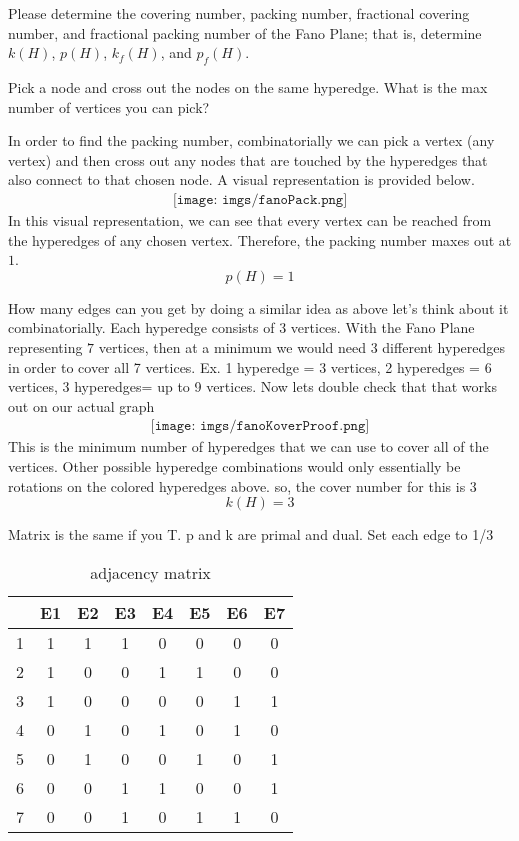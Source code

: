 \documentclass[10pt, AMS Euler]{article}
\begin{document}
Please determine the covering number, packing number, fractional covering number, and fractional packing number of the Fano Plane; that is, determine $k(H)$, $p(H)$, $k_f(H)$, and $p_f(H)$.



Pick a node and cross out the nodes on the same hyperedge. What is the max number of vertices you can pick?

In order to find the packing number, combinatorially we can pick a vertex (any vertex) and then cross out any nodes that are touched by the hyperedges that also connect to that chosen node.  A visual representation is provided below.
\begin{align*}
    \texttt{[image: imgs/fanoPack.png]}
\end{align*}
In this visual representation, we can see that every vertex can be reached from the hyperedges of any chosen vertex. Therefore, the packing number maxes out at $1$.
$$ p(H) = 1 $$

How many edges can you get by doing a similar idea as above 
let's think about it combinatorially. Each hyperedge consists of 3 vertices. With the Fano Plane representing $7$ vertices, then at a minimum we would need 3 different hyperedges in order to cover all 7 vertices. Ex. 1 hyperedge = 3 vertices, 2 hyperedges = 6 vertices, 3 hyperedges= up to 9 vertices. Now lets double check that that works out on our actual graph
\begin{align*}
    \texttt{[image: imgs/fanoKoverProof.png]}
\end{align*}
This is the minimum number of hyperedges that we can use to cover all of the vertices. Other possible hyperedge combinations would only essentially be rotations on the colored hyperedges above. so, the cover number for this is $3$ 
$$ k(H) = 3 $$



Matrix is the same if you T. p and k are primal and dual. Set each edge to 1/3


\begin{center}
    \begin{table}[htbp]
    \centering
    \begin{tabular}{c|ccccccc}
    & E1 & E2 & E3 & E4 & E5 & E6 & E7 \\ \hline
    1 & 1 & 1 & 1 & 0 & 0 & 0 & 0 \\
    2 & 1 & 0 & 0 & 1 & 1 & 0 & 0 \\
    3 & 1 & 0 & 0 & 0 & 0 & 1 & 1 \\
    4 & 0 & 1 & 0 & 1 & 0 & 1 & 0 \\
    5 & 0 & 1 & 0 & 0 & 1 & 0 & 1 \\
    6 & 0 & 0 & 1 & 1 & 0 & 0 & 1 \\
    7 & 0 & 0 & 1 & 0 & 1 & 1 & 0 \\
    \end{tabular}
    \caption{adjacency matrix}
    \label{tab:my-table}
    \end{table}
\end{center}
\end{document}
